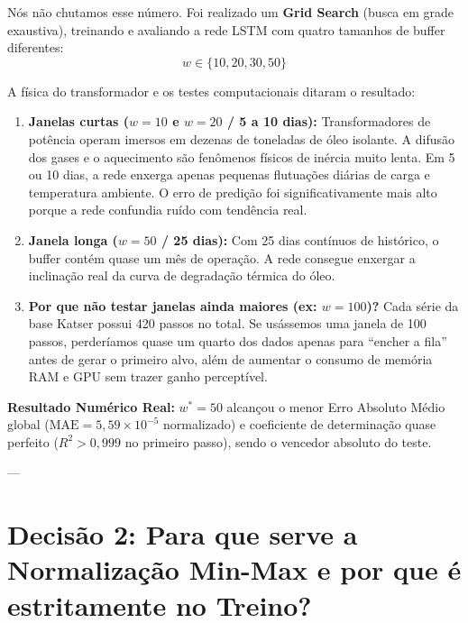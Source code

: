 \documentclass[10pt,a4paper]{article}
\begin{document}
\begin{decisaobox}[Como chegamos em $w=50$ e qual foi a lógica de escolha?]
Nós não chutamos esse número. Foi realizado um \textbf{Grid Search} (busca em grade exaustiva), treinando e avaliando a rede LSTM com quatro tamanhos de buffer diferentes:
$$w \in \{10, 20, 30, 50\}$$

A física do transformador e os testes computacionais ditaram o resultado:
\begin{enumerate}[leftmargin=*,itemsep=2pt]
  \item \textbf{Janelas curtas ($w=10$ e $w=20$ / 5 a 10 dias):} Transformadores de potência operam imersos em dezenas de toneladas de óleo isolante. A difusão dos gases e o aquecimento são fenômenos físicos de inércia muito lenta. Em 5 ou 10 dias, a rede enxerga apenas pequenas flutuações diárias de carga e temperatura ambiente. O erro de predição foi significativamente mais alto porque a rede confundia ruído com tendência real.
  \item \textbf{Janela longa ($w=50$ / 25 dias):} Com 25 dias contínuos de histórico, o buffer contém quase um mês de operação. A rede consegue enxergar a inclinação real da curva de degradação térmica do óleo. 
  \item \textbf{Por que não testar janelas ainda maiores (ex: $w=100$)?} Cada série da base Katser possui 420 passos no total. Se usássemos uma janela de 100 passos, perderíamos quase um quarto dos dados apenas para ``encher a fila'' antes de gerar o primeiro alvo, além de aumentar o consumo de memória RAM e GPU sem trazer ganho perceptível.
\end{enumerate}
\textbf{Resultado Numérico Real:} $w^* = 50$ alcançou o menor Erro Absoluto Médio global ($\text{MAE} = 5,59 \times 10^{-5}$ normalizado) e coeficiente de determinação quase perfeito ($R^2 > 0,999$ no primeiro passo), sendo o vencedor absoluto do teste.
\end{decisaobox}

---

\section{Decisão 2: Para que serve a Normalização Min-Max e por que é estritamente no Treino?}
\end{document}
